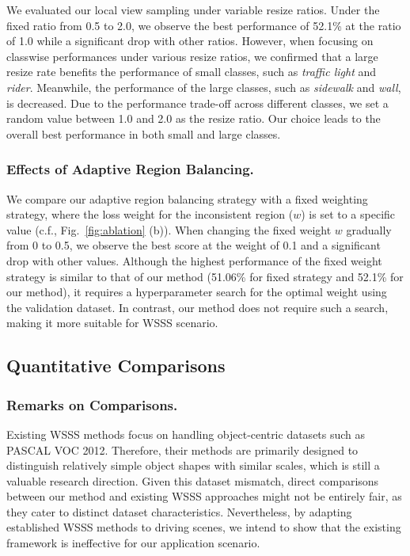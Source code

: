 \documentclass[letterpaper]{article} %
\def\cf{c.f.} \def\Cf{C.f.}
\begin{document}
We evaluated our local view sampling under variable resize ratios. Under the fixed ratio from 0.5 to 2.0, we observe the best performance of 52.1\% at the ratio of 1.0 while a significant drop with other ratios. However, when focusing on classwise performances under various resize ratios, we confirmed that a large resize rate benefits the performance of small classes, such as \textit{traffic light} and \textit{rider}. Meanwhile, the performance of the large classes, such as \textit{sidewalk} and \textit{wall}, is decreased. Due to the performance trade-off across different classes, we set a random value between 1.0 and 2.0 as the resize ratio. Our choice leads to the overall best performance in both small and large classes.

\subsubsection{Effects of Adaptive Region Balancing.} We compare our adaptive region balancing strategy with a fixed weighting strategy, where the loss weight for the inconsistent region ($w$) is set to a specific value (\cf, Fig.~\ref{fig:ablation} (b)). When changing the fixed weight $w$ gradually from 0 to 0.5, we observe the best score at the weight of 0.1 and a significant drop with other values. Although the highest performance of the fixed weight strategy is similar to that of our method (51.06\% for fixed strategy and 52.1\% for our method), it requires a hyperparameter search for the optimal weight using the validation dataset. In contrast, our method does not require such a search, making it more suitable for WSSS scenario.

\subsection{Quantitative Comparisons}
\subsubsection{Remarks on Comparisons.} Existing WSSS methods focus on handling object-centric datasets such as PASCAL VOC 2012. Therefore, their methods are primarily designed to distinguish relatively simple object shapes with similar scales, which is still a valuable research direction. Given this dataset mismatch, direct comparisons between our method and existing WSSS approaches might not be entirely fair, as they cater to distinct dataset characteristics. Nevertheless, by adapting established WSSS methods to driving scenes, we intend to show that the existing framework is ineffective for our application scenario.
\end{document}
